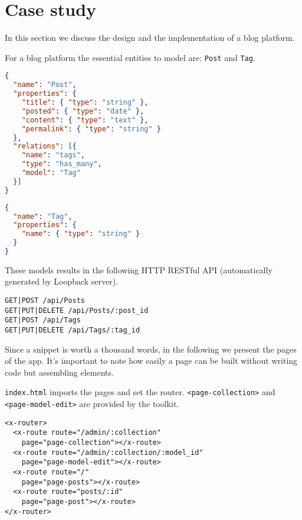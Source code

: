 \section{Case study}\label{sec:case-study}
In this section we discuss the design and the implementation of a blog platform. 

For a blog platform the essential entities to model are: \texttt{Post} and \texttt{Tag}.

\begin{lstlisting}[language=json]
{
  "name": "Post",
  "properties": {
    "title": { "type": "string" },
    "posted": { "type": "date" },
    "content": { "type": "text" },
    "permalink": { "type": "string" }
  }, 
  "relations": [{
    "name": "tags", 
    "type": "has_many", 
    "model": "Tag"
  }]
}
\end{lstlisting}

\begin{lstlisting}[language=json]
{
  "name": "Tag",
  "properties": {
    "name": { "type": "string" }
  }
}
\end{lstlisting}

These models results in the following HTTP RESTful API (automatically generated by Loopback server).

\begin{lstlisting}
GET|POST /api/Posts
GET|PUT|DELETE /api/Posts/:post_id
GET|POST /api/Tags
GET|PUT|DELETE /api/Tags/:tag_id
\end{lstlisting}

Since a snippet is worth a thousand words, in the following we present the pages of the app.
It's important to note how easily a page can be built without writing code but assembling elements. 

\vspace{0.2cm}

\texttt{index.html} imports the pages and set the router.
\texttt{<page-collection>} and \texttt{<page-model-edit>} are provided by the toolkit.


\begin{lstlisting}[language=HTML5]
<x-router>
  <x-route route="/admin/:collection" 
    page="page-collection"></x-route>
  <x-route route="/admin/:collection/:model_id"
    page="page-model-edit"></x-route>
  <x-route route="/" 
    page="page-posts"></x-route>
  <x-route route="posts/:id" 
    page="page-post"></x-route>
</x-router>
\end{lstlisting}

